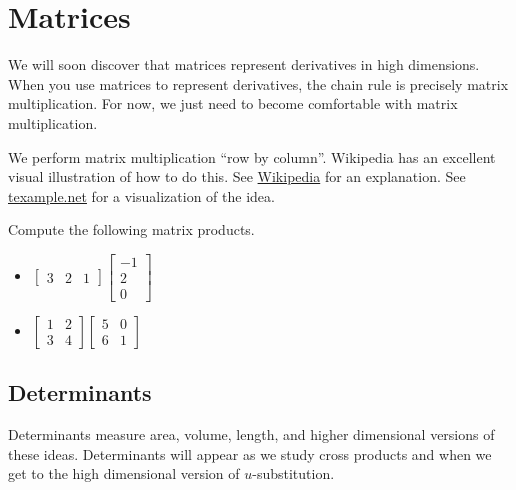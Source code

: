 \section{Matrices}
We will soon discover that matrices represent derivatives in high dimensions. When you use matrices to represent derivatives, the chain rule is precisely matrix multiplication. For now, we just need to become comfortable with matrix multiplication.

We perform matrix multiplication ``row by column''.  Wikipedia has an excellent visual illustration of how to do this. See 
\href{http://en.wikipedia.org/wiki/Matrix\_multiplication}{Wikipedia} for an explanation. See \href{http://www.texample.net/tikz/examples/matrix-multiplication/}{texample.net} for a visualization of the idea.

\begin{problem} 
Compute the following matrix products.
\begin{itemize}
\item $\begin{bmatrix}
3 & 2& 1
\end{bmatrix}
\begin{bmatrix}
-1 \\
 2\\
 0
\end{bmatrix}$
\item
$\begin{bmatrix}1 &2\\3&4\end{bmatrix}\begin{bmatrix}5&0\\6&1\end{bmatrix}$
\end{itemize} \end{problem}

\subsection{Determinants}



Determinants measure area, volume, length, and higher dimensional versions of these ideas.  Determinants will appear as we study cross products and when we get to the high dimensional version of {$u$}-substitution.


